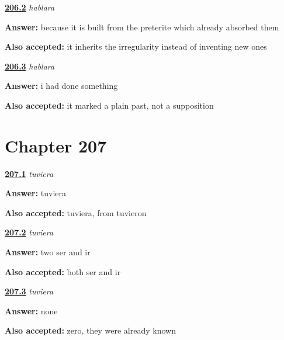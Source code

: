 \noindent\begin{minipage}[t]{\linewidth}
\raggedright
\hyperlink{review-ES-C56-hablara-why}{\textbf{206.2}} \emph{hablara}\par
\small \textbf{Answer:} because it is built from the preterite which already absorbed them\par
\footnotesize \textbf{Also accepted:} it inherits the irregularity instead of inventing new ones
\end{minipage}\par\medskip

\noindent\begin{minipage}[t]{\linewidth}
\raggedright
\hyperlink{review-ES-C56-hablara-etymon}{\textbf{206.3}} \emph{hablara}\par
\small \textbf{Answer:} i had done something\par
\footnotesize \textbf{Also accepted:} it marked a plain past, not a supposition
\end{minipage}\par\medskip

\section*{Chapter 207}

\noindent\begin{minipage}[t]{\linewidth}
\raggedright
\hyperlink{review-ES-C56-tuviera-build}{\textbf{207.1}} \emph{tuviera}\par
\small \textbf{Answer:} tuviera\par
\footnotesize \textbf{Also accepted:} tuviera, from tuvieron
\end{minipage}\par\medskip

\noindent\begin{minipage}[t]{\linewidth}
\raggedright
\hyperlink{review-ES-C56-tuviera-ser}{\textbf{207.2}} \emph{tuviera}\par
\small \textbf{Answer:} two ser and ir\par
\footnotesize \textbf{Also accepted:} both ser and ir
\end{minipage}\par\medskip

\noindent\begin{minipage}[t]{\linewidth}
\raggedright
\hyperlink{review-ES-C56-tuviera-cost}{\textbf{207.3}} \emph{tuviera}\par
\small \textbf{Answer:} none\par
\footnotesize \textbf{Also accepted:} zero, they were already known
\end{minipage}\par\medskip

